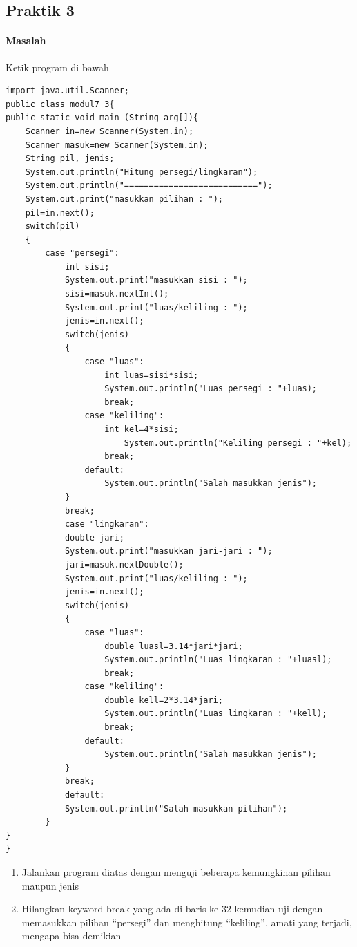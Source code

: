 \documentclass[a4paper,12pt]{article}
\begin{document}
\subsection{Praktik 3}
\paragraph{Masalah\\}
Ketik program di bawah
\begin{lstlisting}
import java.util.Scanner;
public class modul7_3{
public static void main (String arg[]){
    Scanner in=new Scanner(System.in);
    Scanner masuk=new Scanner(System.in);
    String pil, jenis;
    System.out.println("Hitung persegi/lingkaran");
    System.out.println("===========================");
    System.out.print("masukkan pilihan : ");
    pil=in.next();
    switch(pil)
    {
        case "persegi":
            int sisi;
            System.out.print("masukkan sisi : ");
            sisi=masuk.nextInt();
            System.out.print("luas/keliling : ");
            jenis=in.next();
            switch(jenis)
            {
                case "luas":
                    int luas=sisi*sisi;
                    System.out.println("Luas persegi : "+luas);
                    break;
                case "keliling":
                    int kel=4*sisi;
                        System.out.println("Keliling persegi : "+kel);
                    break;
                default:
                    System.out.println("Salah masukkan jenis");
            }
            break;
            case "lingkaran":
            double jari;    
            System.out.print("masukkan jari-jari : ");
            jari=masuk.nextDouble();
            System.out.print("luas/keliling : ");
            jenis=in.next();
            switch(jenis)
            {
                case "luas":
                    double luasl=3.14*jari*jari;
                    System.out.println("Luas lingkaran : "+luasl);
                    break;
                case "keliling":
                    double kell=2*3.14*jari;
                    System.out.println("Luas lingkaran : "+kell);
                    break;
                default:
                    System.out.println("Salah masukkan jenis");
            }
            break;
            default:
            System.out.println("Salah masukkan pilihan");
        }
}
}
\end{lstlisting}
\begin{enumerate}[label=\alph*.]
	\item Jalankan program diatas dengan menguji beberapa kemungkinan pilihan maupun jenis
	\item Hilangkan keyword break yang ada di baris ke 32 kemudian uji dengan
	memasukkan pilihan “persegi” dan menghitung “keliling”, amati yang terjadi,
	mengapa bisa demikian
\end{enumerate}
\end{document}
